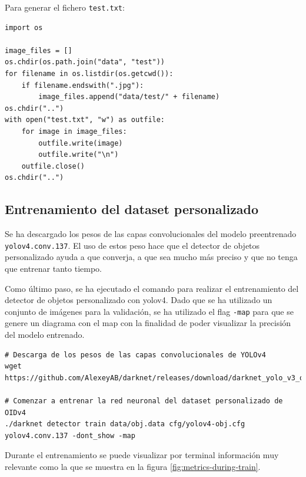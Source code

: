 Para generar el fichero \texttt{test.txt}:

\vspace{0.5cm}
\begin{lstlisting}[language=iPython,caption=Generación del fichero test.txt,captionpos=b,label={lst:test-generate}]
import os

image_files = []
os.chdir(os.path.join("data", "test"))
for filename in os.listdir(os.getcwd()):
    if filename.endswith(".jpg"):
        image_files.append("data/test/" + filename)
os.chdir("..")
with open("test.txt", "w") as outfile:
    for image in image_files:
        outfile.write(image)
        outfile.write("\n")
    outfile.close()
os.chdir("..")
\end{lstlisting}

\subsection{Entrenamiento del dataset personalizado}
\label{subsec:training-custom-dataset}

Se ha descargado los pesos de las capas convolucionales del modelo preentrenado \texttt{yolov4.conv.137}. El uso de estos peso hace que el detector de objetos personalizado ayuda a que converja, a que sea mucho más preciso y que no tenga que entrenar tanto tiempo.

Como último paso, se ha ejecutado el comando para realizar el entrenamiento del detector de objetos personalizado con \gls{yolov4}. Dado que se ha utilizado un conjunto de imágenes para la validación, se ha utilizado el flag \texttt{-map} para que se genere un diagrama con el \gls{map} con la finalidad de poder visualizar la precisión del modelo entrenado.

\vspace{0.5cm}
\begin{lstlisting}[language=iPython,caption=Entrenamiento del dataset personalizado,captionpos=b,label={lst:training-custom-dataset}]
# Descarga de los pesos de las capas convolucionales de YOLOv4
wget https://github.com/AlexeyAB/darknet/releases/download/darknet_yolo_v3_optimal/yolov4.conv.137

# Comenzar a entrenar la red neuronal del dataset personalizado de OIDv4
./darknet detector train data/obj.data cfg/yolov4-obj.cfg yolov4.conv.137 -dont_show -map
\end{lstlisting}

Durante el entrenamiento se puede visualizar por terminal información muy relevante como la que se muestra en la figura \ref{fig:metrics-during-train}.

